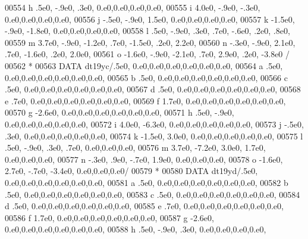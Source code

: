 \begin{DoxyCode}
00554      h            .5e0,  -.9e0,   .3e0,             0.e0,0.e0,0.e0,0.e0,
00555      i           4.0e0,  -.9e0,  -.3e0,             0.e0,0.e0,0.e0,0.e0,
00556      j           -.5e0,  -.9e0,  1.5e0,             0.e0,0.e0,0.e0,0.e0,
00557      k          -1.5e0,  -.9e0, -1.8e0,             0.e0,0.e0,0.e0,0.e0,
00558      l            .5e0,  -.9e0,   .3e0,   .7e0,  -.6e0,   .2e0,   .8e0,
00559      m           3.7e0,  -.9e0, -1.2e0,   .7e0, -1.5e0,   .2e0,  2.2e0,
00560      n           -.3e0,  -.9e0,  2.1e0,   .7e0, -1.6e0,   .2e0,  2.0e0,
00561      o          -1.6e0,  -.9e0, -2.1e0,   .7e0,  2.9e0,   .2e0, -3.8e0 /
00562 \textcolor{comment}{*}
00563       \textcolor{keyword}{DATA} dt19yc/.5e0,                  0.e0,0.e0,0.e0,0.e0,0.e0,0.e0,
00564      a            .5e0,                  0.e0,0.e0,0.e0,0.e0,0.e0,0.e0,
00565      b            .5e0,                  0.e0,0.e0,0.e0,0.e0,0.e0,0.e0,
00566      c            .5e0,                  0.e0,0.e0,0.e0,0.e0,0.e0,0.e0,
00567      d            .5e0,                  0.e0,0.e0,0.e0,0.e0,0.e0,0.e0,
00568      e            .7e0,                  0.e0,0.e0,0.e0,0.e0,0.e0,0.e0,
00569      f           1.7e0,                  0.e0,0.e0,0.e0,0.e0,0.e0,0.e0,
00570      g          -2.6e0,                  0.e0,0.e0,0.e0,0.e0,0.e0,0.e0,
00571      h            .5e0,  -.9e0,             0.e0,0.e0,0.e0,0.e0,0.e0,
00572      i           4.0e0, -6.3e0,             0.e0,0.e0,0.e0,0.e0,0.e0,
00573      j           -.5e0,   .3e0,             0.e0,0.e0,0.e0,0.e0,0.e0,
00574      k          -1.5e0,  3.0e0,             0.e0,0.e0,0.e0,0.e0,0.e0,
00575      l            .5e0,  -.9e0,   .3e0,   .7e0,          0.e0,0.e0,0.e0,
00576      m           3.7e0, -7.2e0,  3.0e0,  1.7e0,          0.e0,0.e0,0.e0,
00577      n           -.3e0,   .9e0,  -.7e0,  1.9e0,          0.e0,0.e0,0.e0,
00578      o          -1.6e0,  2.7e0,  -.7e0, -3.4e0,          0.e0,0.e0,0.e0/
00579 \textcolor{comment}{*}
00580       \textcolor{keyword}{DATA} dt19yd/.5e0,                  0.e0,0.e0,0.e0,0.e0,0.e0,0.e0,
00581      a            .5e0,                  0.e0,0.e0,0.e0,0.e0,0.e0,0.e0,
00582      b            .5e0,                  0.e0,0.e0,0.e0,0.e0,0.e0,0.e0,
00583      c            .5e0,                  0.e0,0.e0,0.e0,0.e0,0.e0,0.e0,
00584      d            .5e0,                  0.e0,0.e0,0.e0,0.e0,0.e0,0.e0,
00585      e            .7e0,                  0.e0,0.e0,0.e0,0.e0,0.e0,0.e0,
00586      f           1.7e0,                  0.e0,0.e0,0.e0,0.e0,0.e0,0.e0,
00587      g          -2.6e0,                  0.e0,0.e0,0.e0,0.e0,0.e0,0.e0,
00588      h            .5e0,  -.9e0,   .3e0,             0.e0,0.e0,0.e0,0.e0,

\end{DoxyCode}
